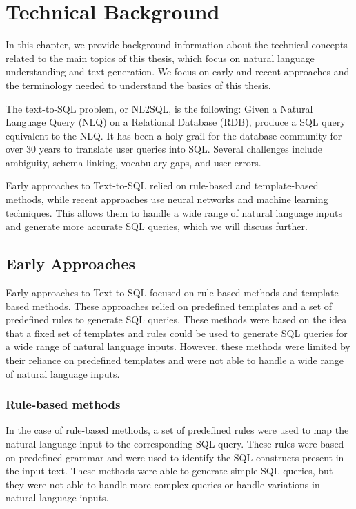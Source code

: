 \section{Technical Background}

In this chapter, we provide background information about the technical concepts related to the main topics of this thesis, which focus on natural language understanding and text generation. We focus on early and recent approaches and the terminology needed to understand the basics of this thesis.

The text-to-SQL problem, or NL2SQL, is the following: Given a Natural Language Query (NLQ) on a Relational Database (RDB), produce a SQL query equivalent to the NLQ. It has been a holy grail for the database community for over 30 years to translate user queries into SQL. Several challenges include ambiguity, schema linking, vocabulary gaps, and user errors.

Early approaches to Text-to-SQL relied on rule-based and template-based methods, while recent approaches use neural networks and machine learning techniques. This allows them to handle a wide range of natural language inputs and generate more accurate SQL queries, which we will discuss further.

\subsection{Early Approaches}

Early approaches to Text-to-SQL focused on rule-based methods and template-based methods. These approaches relied on predefined templates and a set of predefined rules to generate SQL queries. These methods were based on the idea that a fixed set of templates and rules could be used to generate SQL queries for a wide range of natural language inputs. However, these methods were limited by their reliance on predefined templates and were not able to handle a wide range of natural language inputs.

\subsubsection{Rule-based methods}

In the case of rule-based methods, a set of predefined rules were used to map the natural language input to the corresponding SQL query. These rules were based on predefined grammar and were used to identify the SQL constructs present in the input text. These methods were able to generate simple SQL queries, but they were not able to handle more complex queries or handle variations in natural language inputs.

